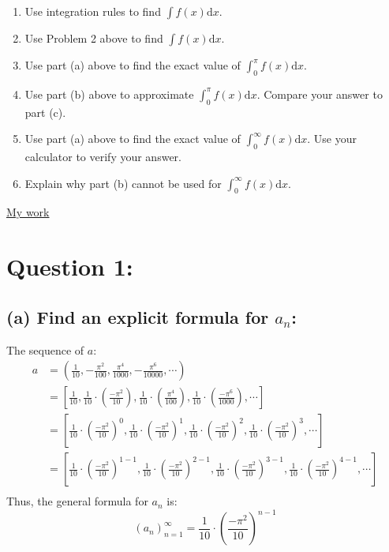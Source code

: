 \documentclass[12pt]{article}
\begin{document}
\begin{enumerate}
\begin{enumerate}
\item Use integration rules to find ${\displaystyle \int f(x) \mathrm{d} x}.$

\item Use Problem 2 above to find ${\displaystyle \int f(x) \mathrm{d} x}.$


\item Use part (a) above to find the exact value of ${\displaystyle \int_0^{\pi} f(x) \mathrm{d} x}.$

\item Use part (b) above to approximate ${\displaystyle \int_0^{\pi} f(x) \mathrm{d} x}.$  Compare your answer to part (c).

\item Use part (a) above to find the exact value of ${\displaystyle \int_0^{\infty} f(x) \mathrm{d} x}.$  Use your calculator to verify your answer.

\item Explain why part (b) cannot be used for ${\displaystyle \int_0^{\infty} f(x) \mathrm{d} x}.$



\end{enumerate}
       
\end{enumerate}


\newpage

\begin{center}
\underline {\Large {My work} }
\end{center}


\section*{Question 1:}
\subsection*{(a) Find an explicit formula for $a_n$:}
The sequence of $a$:
\begin{align*}
    a &= \left(\frac{1}{10},-\frac{\pi^2}{100},\frac{\pi^4}{1000},-\frac{\pi^6}{10000}, \cdots \right) \\
    &= \left[\frac{1}{10},
    \frac{1}{10}\cdot \left(\frac{-\pi^2}{10} \right),
    \frac{1}{10}\cdot \left(\frac{\pi^4}{100} \right),
    \frac{1}{10}\cdot \left(\frac{-\pi^6}{1000} \right),
    \cdots \right] \\
    &=\left[
    \frac{1}{10}\cdot \left(\frac{-\pi^2}{10} \right)^0,
    \frac{1}{10}\cdot \left(\frac{-\pi^2}{10} \right)^1,
    \frac{1}{10}\cdot \left(\frac{-\pi^2}{10} \right)^2,
    \frac{1}{10}\cdot \left(\frac{-\pi^2}{10} \right)^3,
    \cdots \right] \\
    &=\left[
    \frac{1}{10}\cdot \left(\frac{-\pi^2}{10} \right)^{1-1},
    \frac{1}{10}\cdot \left(\frac{-\pi^2}{10} \right)^{2-1},
    \frac{1}{10}\cdot \left(\frac{-\pi^2}{10} \right)^{3-1},
    \frac{1}{10}\cdot \left(\frac{-\pi^2}{10} \right)^{4-1},
    \cdots \right] \\
\end{align*}
Thus, the general formula for $a_n$ is:
$$(a_n)_{n=1}^{\infty} = \frac{1}{10}\cdot \left(\frac{-\pi^2}{10} \right)^{n-1}$$
\end{document}

